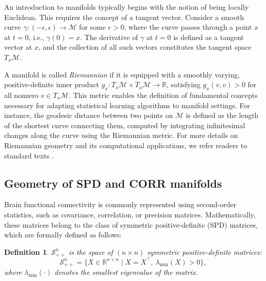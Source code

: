 \documentclass[10pt]{article}
\newtheorem{definition}{Definition}
\newcommand{\calM}{\mathcal{M}}
\newcommand{\SPD}{\mathcal{S}_{++}^n}
\begin{document}
An introduction to manifolds typically begins with the notion of being locally Euclidean. This requires the concept of a tangent vector. Consider a smooth curve $\gamma: (-\epsilon, \epsilon) \rightarrow \calM$ for some $\epsilon > 0$, where the curve passes through a point $x$ at $t=0$, i.e., $\gamma(0) = x$. The derivative of $\gamma$ at $t=0$ is defined as a tangent vector at $x$, and the collection of all such vectors constitutes the tangent space $T_x \calM$. 

A manifold is called \textit{Riemannian} if it is equipped with a smoothly varying, positive-definite inner product $g_x: T_x \calM \times T_x \calM \rightarrow \mathbb{R}$, satisfying $g_x(v,v) > 0$ for all nonzero $v \in T_x \calM$. This metric enables the definition of fundamental concepts necessary for adapting statistical learning algorithms to manifold settings. For instance, the geodesic distance between two points on $\calM$ is defined as the length of the shortest curve connecting them, computed by integrating infinitesimal changes along the curve using the Riemannian metric.  For more details on Riemannian geometry and its computational applications, we refer readers to standard texts \citep{carmo_1992_RiemannianGeometry, absil_2008_OptimizationAlgorithmsMatrix, lee_2018_IntroductionRiemannianManifolds, boumal_2023_IntroductionOptimizationSmooth}.




% 

\subsection{Geometry of SPD and CORR manifolds}

Brain functional connectivity is commonly represented using second-order statistics, such as covariance, correlation, or precision matrices. Mathematically, these matrices belong to the class of symmetric positive-definite (SPD) matrices, which are formally defined as follows:

\begin{definition} 
	$\SPD$ is the space of $(n \times n)$ symmetric positive-definite matrices: 
	\begin{equation*} 
		\SPD = \lbrace X \in \mathbb{R}^{n \times n} \mid X = X^\top,~ \lambda_{\min}(X) > 0 \rbrace, 
	\end{equation*} 
	where $\lambda_{\min}(\cdot)$ denotes the smallest eigenvalue of the matrix. 
\end{definition}
\end{document}
